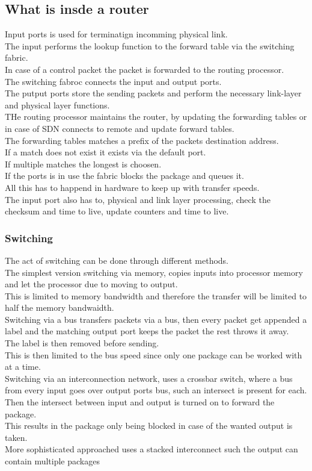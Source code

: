 \documentclass[12pt, a4paper]{article}
\begin{document}
		\subsection{What is insde a router}
			Input ports is used for terminatign incomming physical link.\\
			The input performs the lookup function to the forward table via the switching fabric.\\
			In case of a control packet the packet is forwarded to the routing processor.\\
			The switching fabroc connects the input and output ports.\\
			The putput ports store the sending packets and perform the necessary link-layer and physical layer functions.\\
			THe routing processor maintains the router, by updating the forwarding tables or in case of SDN connects to remote and update forward tables.\\
			The forwarding tables matches a prefix of the packets destination address.\\
			If a match does not exist it exists via the default port.\\
			If multiple matches the longest is choosen.\\
			If the ports is in use the fabric blocks the package and queues it.\\
			All this has to happend in hardware to keep up with transfer speeds.\\
			The input port also has to, physical and link layer processing, check the checksum and time to live, update counters and time to live.\\
			\subsubsection{Switching}
				The act of switching can be done through different methods.\\
				The simplest version switching via memory, copies inputs into processor memory and let the processor due to moving to output.\\
				This is limited to memory bandwidth and therefore the transfer will be limited to half the memory bandwaidth.\\
				Switching via a bus transfers packets via a bus, then every packet get appended a label and the matching output port keeps the packet the rest throws it away.\\
				The label is then removed before sending.\\
				This is then limited to the bus speed since only one package can be worked with at a time.\\
				Switching via an interconnection network, uses a crossbar switch, where a bus from every input goes over output ports bus, such an intersect is present for each.\\
				Then the intersect between input and output is turned on to forward the package.\\
				This results in the package only being blocked in case of the wanted output is taken.\\
				More sophisticated approached uses a stacked interconnect such the output can contain multiple packages
\end{document}
